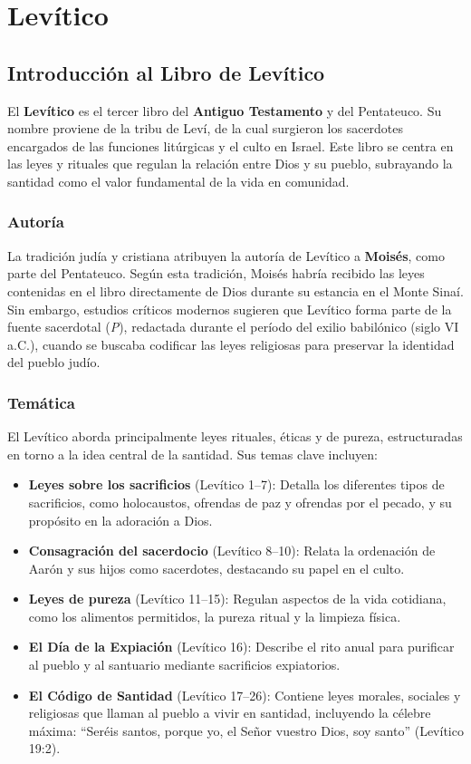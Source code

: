 \chapter{Levítico}

\section*{Introducción al Libro de Levítico}

El \textbf{Levítico} es el tercer libro del \textbf{Antiguo Testamento} y del Pentateuco. Su nombre proviene de la tribu de Leví, de la cual surgieron los sacerdotes encargados de las funciones litúrgicas y el culto en Israel. Este libro se centra en las leyes y rituales que regulan la relación entre Dios y su pueblo, subrayando la santidad como el valor fundamental de la vida en comunidad.

\subsection*{Autoría}

La tradición judía y cristiana atribuyen la autoría de Levítico a \textbf{Moisés}, como parte del Pentateuco. Según esta tradición, Moisés habría recibido las leyes contenidas en el libro directamente de Dios durante su estancia en el Monte Sinaí. Sin embargo, estudios críticos modernos sugieren que Levítico forma parte de la fuente sacerdotal (\textit{P}), redactada durante el período del exilio babilónico (siglo VI a.C.), cuando se buscaba codificar las leyes religiosas para preservar la identidad del pueblo judío.

\subsection*{Temática}

El Levítico aborda principalmente leyes rituales, éticas y de pureza, estructuradas en torno a la idea central de la santidad. Sus temas clave incluyen:
\begin{itemize}
	\item \textbf{Leyes sobre los sacrificios} (Levítico 1–7): Detalla los diferentes tipos de sacrificios, como holocaustos, ofrendas de paz y ofrendas por el pecado, y su propósito en la adoración a Dios.
	\item \textbf{Consagración del sacerdocio} (Levítico 8–10): Relata la ordenación de Aarón y sus hijos como sacerdotes, destacando su papel en el culto.
	\item \textbf{Leyes de pureza} (Levítico 11–15): Regulan aspectos de la vida cotidiana, como los alimentos permitidos, la pureza ritual y la limpieza física.
	\item \textbf{El Día de la Expiación} (Levítico 16): Describe el rito anual para purificar al pueblo y al santuario mediante sacrificios expiatorios.
	\item \textbf{El Código de Santidad} (Levítico 17–26): Contiene leyes morales, sociales y religiosas que llaman al pueblo a vivir en santidad, incluyendo la célebre máxima: “Seréis santos, porque yo, el Señor vuestro Dios, soy santo” (Levítico 19:2).
\end{itemize}



